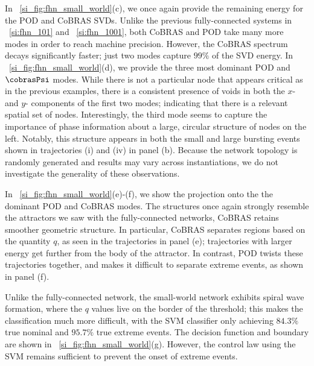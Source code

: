 \documentclass[twocolumn,10pt]{article}
\begin{document}
In \figurename ~\ref{si_fig:fhn_small_world}(c), we once again provide the remaining energy for the POD and CoBRAS SVDs. Unlike the previous fully-connected systems in ~\ref{si:fhn_101} and ~\ref{si:fhn_1001}, both CoBRAS and POD take many more modes in order to reach machine precision. However, the CoBRAS spectrum decays significantly faster; just two modes capture $99\%$ of the SVD energy. In \figurename ~\ref{si_fig:fhn_small_world}(d), we provide the three most dominant POD and $\cobrasPsi$ modes. While there is not a particular node that appears critical as in the previous examples, there is a consistent presence of voids in both the $x$- and $y$- components of the first two modes; indicating that there is a relevant spatial set of nodes. Interestingly, the third mode seems to capture the importance of phase information about a large, circular structure of nodes on the left. Notably, this structure appears in both the small and large bursting events shown in trajectories (i) and (iv) in panel (b). Because the network topology is randomly generated and results may vary across instantiations, we do not investigate the generality of these observations.

In \figurename ~\ref{si_fig:fhn_small_world}(e)-(f), we show the projection onto the the dominant POD and CoBRAS modes. The structures once again strongly resemble the attractors we saw with the fully-connected networks, CoBRAS retains smoother geometric structure. In particular, CoBRAS separates regions based on the quantity $q$, as seen in the trajectories in panel (e); trajectories with larger energy get further from the body of the attractor. In contrast, POD twists these trajectories together, and makes it difficult to separate extreme events, as shown in panel (f).

Unlike the fully-connected network, the small-world network exhibits spiral wave formation, where the $q$ values live on the border of the threshold; this makes the classification much more difficult, with the SVM classifier only achieving $84.3\%$ true nominal and $95.7\%$ true extreme events. The decision function and boundary are shown in \figurename ~\ref{si_fig:fhn_small_world}(g). However, the control law using the SVM remains sufficient to prevent the onset of extreme events. 
\end{document}
